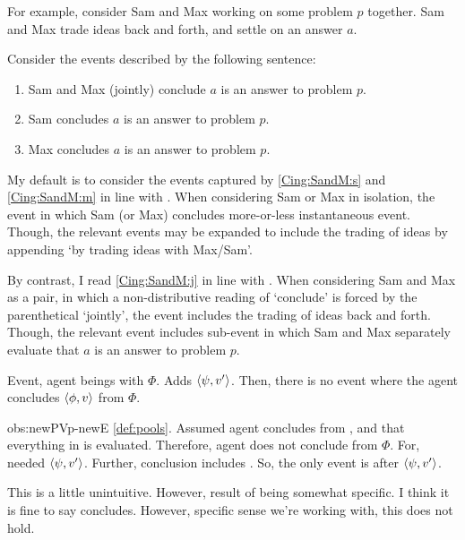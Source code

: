 \begin{note}
{  For example, consider Sam and Max working on some problem \(p\) together.
  Sam and Max trade ideas back and forth, and settle on an answer \(a\).

  Consider the events described by the following sentence:
  \begin{enumerate}[label=\arabic*., ref=(\arabic*), noitemsep]
  \item
    \label{Cing:SandM:j}
    Sam and Max (jointly) conclude \(a\) is an answer to problem \(p\).
  \item
    \label{Cing:SandM:s}
    Sam concludes \(a\) is an answer to problem \(p\).
  \item
    \label{Cing:SandM:m}
    Max concludes \(a\) is an answer to problem \(p\).
  \end{enumerate}

  My default is to consider the events captured by \ref{Cing:SandM:s} and \ref{Cing:SandM:m} in line with \citeauthor{Gardner:1986wp}.
  When considering Sam or Max in isolation, the event in which Sam (or Max) concludes more-or-less instantaneous event.
  Though, the relevant events may be expanded to include the trading of ideas by appending `by trading ideas with Max/Sam'.

  By contrast, I read \ref{Cing:SandM:j} in line with \citeauthor{Bratman:1979aa}.
  When considering Sam and Max as a pair, in which a non-distributive reading of `conclude' is forced by the parenthetical `jointly', the event includes the trading of ideas back and forth.
  Though, the relevant event includes sub-event in which Sam and Max separately evaluate that \(a\) is an answer to problem \(p\).
  }
\end{note}

\begin{note}
  \begin{observation}%
    \label{obs:newPVp-newE}%
    Event, agent beings with \pool{} \(\Phi\).
    Adds \(\langle \psi, v' \rangle\).
    Then, there is no event where the agent concludes \(\langle \phi, v \rangle\) from \(\Phi\).
  \end{observation}

  \begin{motivation}{obs:newPVp-newE}%
    \autoref{def:pools}.
    Assumed agent concludes from \pool{}, and that everything in \pool{} is evaluated.
    Therefore, agent does not conclude from \(\Phi\).
    For, needed \(\langle \psi, v' \rangle\).
    Further, conclusion includes \pool{}.
    So, the only event is after \(\langle \psi, v' \rangle\).
  \end{motivation}

  This is a little unintuitive.
  However, result of being somewhat specific.
  I think it is fine to say concludes.
  However, specific sense we're working with, this does not hold.
\end{note}

